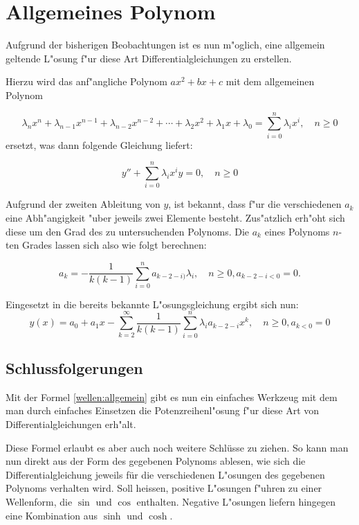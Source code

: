 \section{Allgemeines Polynom}
Aufgrund der bisherigen Beobachtungen ist es nun m"oglich, eine 
allgemein geltende L"osung f"ur diese Art Differentialgleichungen zu 
erstellen.

Hierzu wird das anf"angliche Polynom $ax^2 + bx + c$ mit dem allgemeinen Polynom

\begin{equation*}
	\lambda_nx^n + \lambda_{n-1}x^{n-1} + \lambda_{n-2}x^{n-2} + \dotsb + 
	\lambda_2x^2 + \lambda_1x + \lambda_0 = \sum_{i=0}^{n}\lambda_ix^i, \quad n 
	\ge 0
\end{equation*}
ersetzt, was dann folgende Gleichung liefert:

\begin{equation*}
	y''+\sum_{i=0}^{n}\lambda_ix^i y=0, \quad n \ge 0
\end{equation*}

Aufgrund der zweiten Ableitung von $y$, ist bekannt, dass f"ur die 
verschiedenen $a_k$ eine Abh"angigkeit "uber jeweils zwei Elemente besteht. 
Zus"atzlich erh"oht sich diese um den Grad des zu untersuchenden Polynoms. 
Die $a_k$ eines Polynoms $n$-ten Grades lassen sich also wie folgt berechnen:

\begin{equation*}
	a_k = -\frac{1}{k(k-1)}\sum_{i=0}^{n}a_{k-2-i)}\lambda_i, \quad n \ge 0, 
	a_{k-2-i < 0} =  0.
\end{equation*}

Eingesetzt in die bereits bekannte L"osungsgleichung ergibt sich nun:
\begin{equation}
	y(x) = a_0 + a_1x - \sum_{k=2}^{\infty}\frac{1}{k(k-1)}\sum_{i=0}^{n}
	\lambda_ia_{k-2-i}x^k, \quad n \ge 0, a_{k < 0} = 0
	\label{wellen:allgemein}
\end{equation}

\subsection{Schlussfolgerungen}

Mit der Formel \ref{wellen:allgemein} gibt es nun ein einfaches Werkzeug mit 
dem man durch einfaches Einsetzen die Potenzreihenl"osung f"ur diese Art von 
Differentialgleichungen erh"alt.

Diese Formel erlaubt es aber auch noch weitere Schlüsse zu ziehen. So kann man 
nun direkt aus der Form des gegebenen Polynoms ablesen, wie sich die 
Differentialgleichung jeweils für die verschiedenen L"osungen des gegebenen 
Polynoms verhalten wird. Soll heissen, positive L"osungen f"uhren zu einer 
Wellenform, die $\sin$ und $\cos$ enthalten. Negative L"osungen liefern 
hingegen eine Kombination aus $\sinh$ und $\cosh$.

